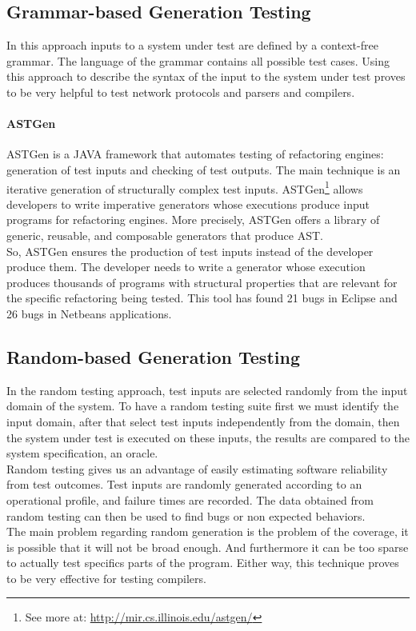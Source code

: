 \subsection{Grammar-based Generation Testing}
In this approach inputs to a system under test are defined by a context-free grammar. The language of the grammar contains all possible test cases.
Using this approach to describe the syntax of the input to the system under test proves to be very helpful to test
network protocols\cite{tal:syntax-based,kaksonen2001functional} and parsers and compilers\cite{1994-burgess,Burgess_Saidi_1996}.

\paragraph{ASTGen}
ASTGen\cite{Daniel:2007:ATR:1287624.1287651} is a JAVA framework that automates testing of refactoring engines: generation of test inputs
and checking of test outputs. The main technique is an iterative generation of structurally complex test inputs.
ASTGen\footnote{See more at: \url{http://mir.cs.illinois.edu/astgen/}} allows developers to write imperative generators whose executions
produce input programs for refactoring engines. More precisely, ASTGen
offers a library of generic, reusable, and composable generators that produce \ac{AST}.\\
So, ASTGen ensures the production of test inputs instead of the developer produce them. The developer needs to write a generator whose execution
produces thousands of programs with structural properties that are relevant for the specific refactoring being tested. This tool has found
21 bugs in Eclipse and 26 bugs in Netbeans applications.

\subsection{Random-based Generation Testing}
In the random testing approach, test inputs are selected randomly from the input domain of the system.
To have a random testing suite first we must identify the input domain, after that select test inputs independently from the domain,
then the system under test is executed on these inputs, the results are compared to the system specification, an oracle.\\
Random testing gives us an advantage of easily estimating software reliability from test outcomes.
Test inputs are randomly generated according to an operational profile, and failure times are recorded.
The data obtained from random testing can then be used to find bugs or non expected behaviors.\\
\indent The main problem regarding random generation is the problem of the coverage, it is possible that it will not be broad enough. And furthermore it can be
too sparse to actually test specifics parts of the program. Either way, this technique proves to be very effective for testing compilers.

